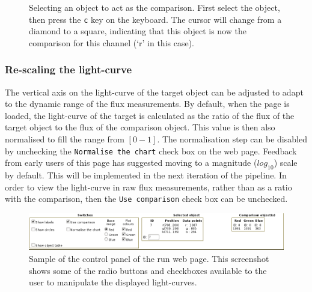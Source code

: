 \begin{figure}
  \centering
  \setlength{\fboxrule}{1pt}

  \caption{Selecting an object to act as the comparison. First select the object, then press the \texttt{c} key on the keyboard. The cursor will change from a diamond to a square, indicating that this object is now the comparison for this channel (`r' in this case).}
  \label{fig:selectcomparison}
\end{figure}  

\subsubsection{Re-scaling the light-curve}
The vertical axis on the light-curve of the target object can be adjusted to adapt to the dynamic range of the flux measurements. By default, when the page is loaded, the light-curve of the target is calculated as the ratio of the flux of the target object to the flux of the comparison object. This value is then also normalised to fill the range from $[0 - 1]$. The normalisation step can be disabled by unchecking the \texttt{Normalise the chart} check box on the web page. Feedback from early users of this page has suggested moving to a magnitude ($log_{10}$) scale by default. This will be implemented in the next iteration of the pipeline. In order to view the light-curve in raw flux measurements, rather than as a ratio with the comparison, then the \texttt{Use comparison} check box can be unchecked.

\begin{figure}
  \centering
  \includegraphics[width=140mm]{images/webcontrols.png}
  \caption{Sample of the control panel of the run web page. This screenshot shows some of the radio buttons and checkboxes available to the user to manipulate the displayed light-curves. }
  \label{fig:webcontrols}
\end{figure}  

